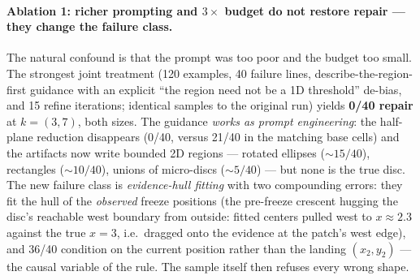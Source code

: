 \documentclass[11pt]{article}
\theoremstyle{definition}
\theoremstyle{remark}
\begin{document}
\paragraph{Ablation 1: richer prompting and $3\times$ budget do not restore repair --- they change the failure class.} The natural confound is that the prompt was too poor and the budget too small. The strongest joint treatment (120 examples, 40 failure lines, describe-the-region-first guidance with an explicit ``the region need not be a 1D threshold'' de-bias, and 15 refine iterations; identical samples to the original run) yields \textbf{0/40 repair} at $k=(3,7)$, both sizes. The guidance \emph{works as prompt engineering}: the half-plane reduction disappears (0/40, versus 21/40 in the matching base cells) and the artifacts now write bounded 2D regions --- rotated ellipses (${\sim}15/40$), rectangles (${\sim}10/40$), unions of micro-discs (${\sim}5/40$) --- but none is the true disc. The new failure class is \emph{evidence-hull fitting} with two compounding errors: they fit the hull of the \emph{observed} freeze positions (the pre-freeze crescent hugging the disc's reachable west boundary from outside: fitted centers pulled west to $x \approx 2.3$ against the true $x = 3$, i.e.\ dragged onto the evidence at the patch's west edge), and 36/40 condition on the current position rather than the landing $(x_2, y_2)$ --- the causal variable of the rule. The sample itself then refuses every wrong shape.
\end{document}
